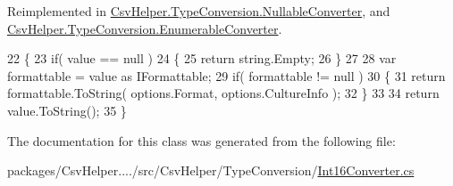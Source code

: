 Reimplemented in \hyperlink{a00114_a7205cdb61d2d119582958232b3e63109}{Csv\-Helper.\-Type\-Conversion.\-Nullable\-Converter}, and \hyperlink{a00076_a7e07e9532857d748654d37db590a0e11}{Csv\-Helper.\-Type\-Conversion.\-Enumerable\-Converter}.


\begin{DoxyCode}
22         \{
23             \textcolor{keywordflow}{if}( value == null )
24             \{
25                 \textcolor{keywordflow}{return} string.Empty;
26             \}
27 
28             var formattable = value as IFormattable;
29             \textcolor{keywordflow}{if}( formattable != null )
30             \{
31                 \textcolor{keywordflow}{return} formattable.ToString( options.Format, options.CultureInfo );
32             \}
33 
34             \textcolor{keywordflow}{return} value.ToString();
35         \}
\end{DoxyCode}


The documentation for this class was generated from the following file\-:\begin{DoxyCompactItemize}
\item 
packages/\-Csv\-Helper..../src/\-Csv\-Helper/\-Type\-Conversion/\hyperlink{a00232}{Int16\-Converter.\-cs}\end{DoxyCompactItemize}
